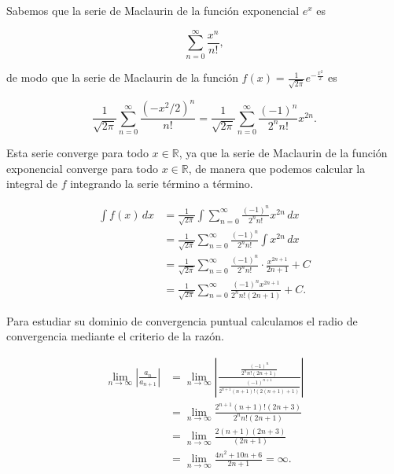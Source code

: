 \documentclass[
  spanish,
  a4paper,
]{scrreport}
\theoremstyle{definition}
\theoremstyle{remark}
\begin{document}
\begin{tcolorbox}[enhanced jigsaw, arc=.35mm, bottomrule=.15mm, bottomtitle=1mm, breakable, colback=white, colbacktitle=quarto-callout-tip-color!10!white, colframe=quarto-callout-tip-color-frame, coltitle=black, left=2mm, leftrule=.75mm, opacityback=0, opacitybacktitle=0.6, rightrule=.15mm, title=\textcolor{quarto-callout-tip-color}{\faLightbulb}\hspace{0.5em}{Solución}, titlerule=0mm, toprule=.15mm, toptitle=1mm]

Sabemos que la serie de Maclaurin de la función exponencial \(e^x\) es

\[
\sum_{n=0}^\infty \frac{x^n}{n!},
\]

de modo que la serie de Maclaurin de la función
\(f(x) = \frac{1}{\sqrt{2\pi}}e^{-\frac{x^2}{2}}\) es

\[
\frac{1}{\sqrt{2\pi}}\sum_{n=0}^\infty \frac{(-x^2/2)^n}{n!}
= \frac{1}{\sqrt{2\pi}}\sum_{n=0}^\infty \frac{(-1)^n}{2^n n!} x^{2n}.
\]

Esta serie converge para todo \(x \in \mathbb{R}\), ya que la serie de
Maclaurin de la función exponencial converge para todo
\(x \in \mathbb{R}\), de manera que podemos calcular la integral de
\(f\) integrando la serie término a término.

\begin{align*}
\int f(x)\,dx 
&= \frac{1}{\sqrt{2\pi}}\int \sum_{n=0}^\infty \frac{(-1)^n}{2^n n!} x^{2n}\,dx \\
&= \frac{1}{\sqrt{2\pi}}\sum_{n=0}^\infty \frac{(-1)^n}{2^n n!} \int x^{2n}\,dx \\
&= \frac{1}{\sqrt{2\pi}}\sum_{n=0}^\infty \frac{(-1)^n}{2^n n!} \cdot \frac{x^{2n+1}}{2n+1} + C \\
&= \frac{1}{\sqrt{2\pi}}\sum_{n=0}^\infty \frac{(-1)^n x^{2n+1}}{2^n n!(2n+1)} + C.
\end{align*}

Para estudiar su dominio de convergencia puntual calculamos el radio de
convergencia mediante el criterio de la razón.

\begin{align*}
\lim_{n \to \infty} \left| \frac{a_n}{a_{n+1}} \right|
&= \lim_{n \to \infty} \left| \frac{\frac{(-1)^n}{2^n n!(2n+1)}}{\frac{(-1)^{n+1}}{2^{n+1} (n+1)!(2(n+1)+1)}} \right| \\
&= \lim_{n \to \infty} \frac{2^{n+1} (n+1)!(2n+3)}{2^n n!(2n+1)}\\
&= \lim_{n \to \infty} \frac{2(n+1)(2n+3)}{(2n+1)} \\
&= \lim_{n \to \infty} \frac{4n^2+10n+6}{2n+1} 
= \infty.
\end{align*}


\end{tcolorbox}
\end{document}
